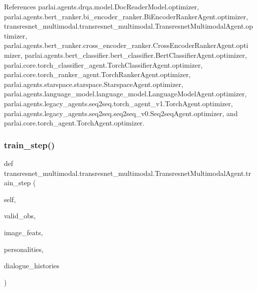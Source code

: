 References parlai.\+agents.\+drqa.\+model.\+Doc\+Reader\+Model.\+optimizer, parlai.\+agents.\+bert\+\_\+ranker.\+bi\+\_\+encoder\+\_\+ranker.\+Bi\+Encoder\+Ranker\+Agent.\+optimizer, transresnet\+\_\+multimodal.\+transresnet\+\_\+multimodal.\+Transresnet\+Multimodal\+Agent.\+optimizer, parlai.\+agents.\+bert\+\_\+ranker.\+cross\+\_\+encoder\+\_\+ranker.\+Cross\+Encoder\+Ranker\+Agent.\+optimizer, parlai.\+agents.\+bert\+\_\+classifier.\+bert\+\_\+classifier.\+Bert\+Classifier\+Agent.\+optimizer, parlai.\+core.\+torch\+\_\+classifier\+\_\+agent.\+Torch\+Classifier\+Agent.\+optimizer, parlai.\+core.\+torch\+\_\+ranker\+\_\+agent.\+Torch\+Ranker\+Agent.\+optimizer, parlai.\+agents.\+starspace.\+starspace.\+Starspace\+Agent.\+optimizer, parlai.\+agents.\+language\+\_\+model.\+language\+\_\+model.\+Language\+Model\+Agent.\+optimizer, parlai.\+agents.\+legacy\+\_\+agents.\+seq2seq.\+torch\+\_\+agent\+\_\+v1.\+Torch\+Agent.\+optimizer, parlai.\+agents.\+legacy\+\_\+agents.\+seq2seq.\+seq2seq\+\_\+v0.\+Seq2seq\+Agent.\+optimizer, and parlai.\+core.\+torch\+\_\+agent.\+Torch\+Agent.\+optimizer.

\mbox{\label{classtransresnet__multimodal_1_1transresnet__multimodal_1_1TransresnetMultimodalAgent_a7a753d1b9c14dfed7cb4557051f14115}} 
\subsubsection{\texorpdfstring{train\+\_\+step()}{train\_step()}}
{\footnotesize\ttfamily def transresnet\+\_\+multimodal.\+transresnet\+\_\+multimodal.\+Transresnet\+Multimodal\+Agent.\+train\+\_\+step (\begin{DoxyParamCaption}\item[{}]{self,  }\item[{}]{valid\+\_\+obs,  }\item[{}]{image\+\_\+feats,  }\item[{}]{personalities,  }\item[{}]{dialogue\+\_\+histories }\end{DoxyParamCaption})}

